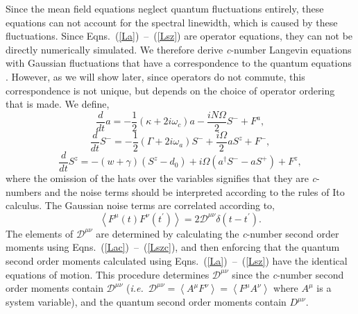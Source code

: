 \documentclass[aps,
twocolumn,
superscriptaddress,groupedaddress]{revtex4}
\begin{document}
Since the mean field equations neglect quantum fluctuations entirely, these equations can not account for the spectral linewidth, which is caused by these fluctuations. Since Eqns.~(\ref{La})~--~(\ref{Lsz}) are operator equations, they can not be directly numerically simulated. We therefore derive {\it c}-number
Langevin equations with Gaussian fluctuations that have a correspondence to the quantum equations \cite{Scully97}. However, as we will show later, since operators do not commute, this correspondence is not unique, but depends on the choice of operator ordering that is made. We define,
\begin{equation}
\frac{d}{dt} a= -\frac{1}{2}  (\kappa +2i\omega_c) a
-\frac{i N \Omega}{2} S^{-}
+F^{a},
\label{Lac}
\end{equation}
\begin{equation}
\frac{d}{dt} S^{-} = -\frac{1}{2}  \left(\Gamma +2 i \omega_a \right)  S^{-}
+\frac{i \Omega}{2} a S^{z}
+F^{-},
\end{equation}
\begin{equation}
\frac{d}{dt} S^{z} = -(w+\gamma)\left( S^{z} - d_0\right)
+i\Omega \left( a^{\dagger}S^{-} - a S^{+} \right)
\label{Lszc}
+F^{z},
\end{equation}
where the omission of the hats over the variables signifies that they
are {\it c}-numbers and the noise terms should be interpreted according
to the rules of Ito calculus.  The Gaussian noise terms are correlated
according to,
\begin{equation}
\left< F^{\mu}(t) F^{\nu}(t^{\prime})\right> =
2 \mathscr{D}^{\mu \nu} \delta(t-t^{\prime}).
\label{ClassicalDiffusion1}
\end{equation}
The elements of $\mathscr{D}^{\mu \nu}$ are determined by calculating the
{\it c}-number second order moments using Eqns.~(\ref{Lac})~--~(\ref{Lszc}), and then enforcing that the quantum second order moments calculated using Eqns.~(\ref{La})~--~(\ref{Lsz}) have the identical equations of motion. This procedure determines $\mathscr{D}^{\mu \nu}$ since the {\it c}-number second order moments contain $\mathscr{D}^{\mu \nu}$ ({\em i.e.}\ $\mathscr{D}^{\mu \nu} =
\left<A^{\mu}F^{\nu}\right>=\left<F^{\mu}A^{\nu}\right>$ where $A^{\mu}$
is a system variable), and the quantum second order moments contain $D^{\mu \nu}$.
\end{document}

